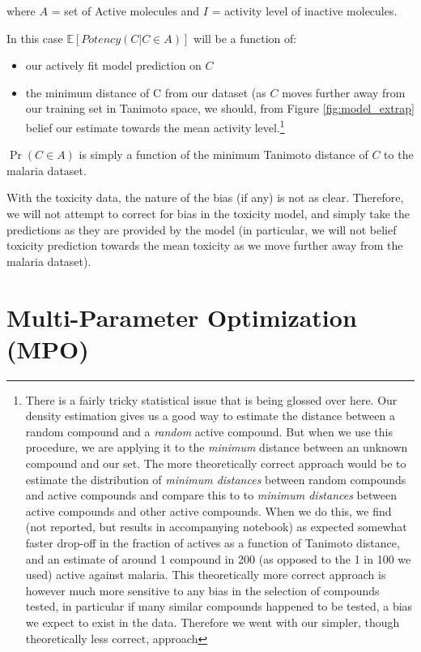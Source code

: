 \documentclass[journal=jacsat,manuscript=article]{achemso}
\begin{document}
where $A$ = set of Active molecules and $I$ = activity level of inactive molecules.

In this case $\mathbb{E}[Potency(C | C \in A)]$ will be a function of: \begin{itemize}
    \item our actively fit model prediction on $C$
    \item the minimum distance of C from our dataset (as $C$ moves further away from our training set in Tanimoto space, we should, from Figure \ref{fig:model_extrap} belief our estimate towards the mean activity level.\footnote{There is a fairly tricky statistical issue that is being glossed over here.  Our density estimation gives us a good way to estimate the distance between a random compound and a \textit{random} active compound.  But when we use this procedure, we are applying it to the \textit{minimum} distance between an unknown compound and our set.  The more theoretically correct approach would be to estimate the distribution of \textit{minimum distances} between random compounds and active compounds and compare this to to \textit{minimum distances} between active compounds and other active compounds.  When we do this, we find (not reported, but results in accompanying notebook) as expected somewhat faster drop-off in the fraction of actives as a function of Tanimoto distance, and an estimate of around 1 compound in 200 (as opposed to the 1 in 100 we used) active against malaria.  This theoretically more correct approach is however much more sensitive to any bias in the selection of compounds tested, in particular if many similar compounds happened to be tested, a bias we expect to exist in the data.  Therefore we went with our simpler, though theoretically less correct, approach}
\end{itemize}

$\Pr(C \in A)$ is simply a function of the minimum Tanimoto distance of $C$ to the malaria dataset.


With the toxicity data, the nature of the bias (if any) is not as clear.  Therefore, we will not attempt to correct for bias in the toxicity model, and simply take the predictions as they are provided by the model (in particular, we will not belief toxicity prediction towards the mean toxicity as we move further away from the malaria dataset).


\section*{Multi-Parameter Optimization (MPO)}
\end{document}
